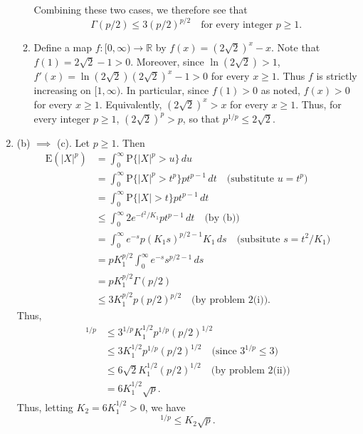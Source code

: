 \documentclass[12pt]{article}
\newcommand{\E}{\mathrm{E}}
\newcommand{\Prob}{\mathrm{P}}
\begin{document}
\begin{enumerate}
\begin{enumerate}[label=(\roman*)]
Combining these two cases, we therefore see that
\begin{equation*}
\Gamma(p/2) \leq 3(p/2)^{p/2} \quad \text{for every integer $p \geq 1$}.
\end{equation*}

\item
Define a map $f : [0, \infty) \to \mathbb{R}$ by $f(x) = (2\sqrt{2})^x - x$. Note that $f(1) = 2\sqrt{2} - 1 > 0$. Moreover, since $\ln(2\sqrt{2}) > 1$, $f'(x) = \ln(2\sqrt{2})(2\sqrt{2})^x - 1 > 0$ for every $x \geq 1$. Thus $f$ is strictly increasing on $[1, \infty)$. In particular, since $f(1) > 0$ as noted, $f(x) > 0$ for every $x \geq 1$. Equivalently, $(2\sqrt{2})^x > x$ for every $x \geq 1$. Thus, for every integer $p \geq 1$, $(2\sqrt{2})^p > p$, so that $p^{1/p} \leq 2\sqrt{2}$.

\end{enumerate}

\item
(b) $\implies$ (c). Let $p \geq 1$. Then
\begin{align*}
\E(|X|^p) &= \int_0^\infty \Prob\{|X|^p > u\} \, du \\
&= \int_0^\infty \Prob\{|X|^p > t^p\} pt^{p-1} \, dt \quad \text{(substitute $u = t^p$)} \\
&= \int_0^\infty \Prob\{|X| > t\} pt^{p-1} \, dt \\
&\leq \int_0^\infty 2e^{-t^2/K_1} pt^{p-1} \, dt \quad \text{(by (b))} \\
&= \int_0^\infty e^{-s} p (K_1 s)^{p/2-1} K_1 \, ds \quad \text{(subsitute $s = t^2/K_1$}) \\
&= pK_1^{p/2} \int_0^\infty e^{-s} s^{p/2-1} \, ds \\
&= pK_1^{p/2} \Gamma(p/2) \\
&\leq 3K_1^{p/2} p(p/2)^{p/2} \quad \text{(by problem 2(i))}.
\end{align*}
Thus,
\begin{align*}
[\E(|X|^p)]^{1/p} &\leq 3^{1/p} K_1^{1/2} p^{1/p} (p/2)^{1/2} \\
&\leq 3K_1^{1/2} p^{1/p} (p/2)^{1/2} \quad \text{(since $3^{1/p} \leq 3$)} \\
&\leq 6\sqrt{2} K_1^{1/2} (p/2)^{1/2} \quad \text{(by problem 2(ii))} \\
&= 6K_1^{1/2} \sqrt{p}.
\end{align*}
Thus, letting $K_2 = 6K_1^{1/2} > 0$, we have
\begin{equation*}
[\E(|X|^p)]^{1/p} \leq K_2 \sqrt{p}.
\end{equation*}


\end{enumerate}
\end{document}
